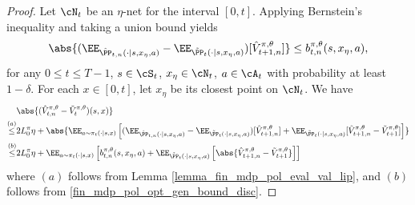 \documentclass[9pt]{article}
\numberwithin{equation}{section}
\begin{document}
\begin{proof}
    Let $\cN_t$ be an $\eta$-net for the interval $[0,t]$. Applying Bernstein's inequality and taking a union bound yields
    \begin{equation}
    \label{fin_mdp_pol_opt_gen_bound_disc}
        \abs{(\EE_{\hat{\PP}_{t,n} (\cdot|s,x_\eta,a)} - \EE_{\tilde{\PP}_t (\cdot|s,x_\eta,a)})[\hat{V}_{t+1,n}^{\pi, \theta}]} \leq b_{t,n}^{\pi, \theta}(s,x_\eta, a), 
    \end{equation}
for any $ 0 \leq t \leq T-1$,  $s \in \cS_t$, $x_\eta \in \cN_t$,  $a \in \cA_t$ with probability at least $1- \delta$.
    For each $x \in [0,t]$, let $x_\eta$ be its closest point on $\cN_t$. We have
    \begin{align}
        & \abs{(\hat{V}_{t,n}^{\pi, \theta} - \tilde{V}_{t}^{\pi, \theta})(s,x)}\nonumber \\
        \overset{(a)}{\leq} & 2L_{0}^\pi \eta + \abs{\EE_{a \sim \pi_t (\cdot|s,x)} \left[ (\EE_{\hat{\PP}_{t,n}(\cdot|s,x_\eta,a)} - \EE_{\tilde{\PP}_{t}(\cdot|s,x_\eta,a)}) [\hat{V}_{t+1,n}^{\pi, \theta}] + \EE_{\tilde{\PP}_t (\cdot|s,x_\eta,a)}[\hat{V}_{t+1,n}^{\pi, \theta} - \tilde{V}_{t+1}^{\pi, \theta}] \right]} \nonumber \\
        \overset{(b)}{\leq} & 2 L_{0}^\pi \eta + \EE_{a \sim \pi_t (\cdot|s,x)} \left[ b_{t,n}^{\pi, \theta}(s,x_\eta, a) + \EE_{\tilde{\PP}_t (\cdot|s,x_\eta,a)}\left[\abs{\hat{V}_{t+1,n}^{\pi, \theta} - \tilde{V}_{t+1}^{\pi, \theta}}\right] \right]  \label{ineq_opt_val_err_uniform_raw}
            \end{align}
    where $(a)$ follows from Lemma \ref{lemma_fin_mdp_pol_eval_val_lip}, and $(b)$ follows from \eqref{fin_mdp_pol_opt_gen_bound_disc}.
    

\end{proof}
\end{document}
